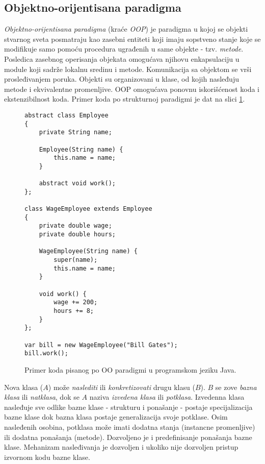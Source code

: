 \subsection{Objektno-orijentisana paradigma}
\label{subsec:ParadigmOOP}

\emph{Objektno-orijentisana paradigma} (kraće \emph{OOP}) je paradigma u kojoj se objekti stvarnog sveta posmatraju kao zasebni entiteti koji imaju sopstveno stanje koje se modifikuje samo pomoću procedura ugrađenih u same objekte - tzv. \emph{metode}. Posledica zasebnog operisanja objekata omogućava njihovu enkapsulaciju u module koji sadrže lokalnu sredinu i metode. Komunikacija sa objektom se vrši prosleđivanjem poruka. Objekti su organizovani u klase, od kojih nasleđuju metode i ekvivalentne promenljive. OOP omogućava ponovnu iskorišćenost koda i ekstenzibilnost koda. Primer koda po strukturnoj paradigmi je dat na slici \ref{fig:ParadigmOOP}. 

\begin{figure}[h!]
\begin{lstlisting}
abstract class Employee
{
    private String name;

    Employee(String name) {
        this.name = name;
    }

    abstract void work();
};

class WageEmployee extends Employee
{
    private double wage;
    private double hours;

    WageEmployee(String name) {
        super(name);
        this.name = name;
    }

    void work() {
        wage += 200;
        hours += 8;
    }
};

var bill = new WageEmployee("Bill Gates");
bill.work();
\end{lstlisting}
\caption{Primer koda pisanog po OO paradigmi u programskom jeziku Java.}
\label{fig:ParadigmOOP}
\end{figure}

Nova klasa ($A$) može \emph{naslediti} ili \emph{konkretizovati} drugu klasu ($B$). $B$ se zove \emph{bazna klasa} ili \emph{natklasa}, dok se $A$ naziva \emph{izvedena klasa} ili \emph{potklasa}. Izvedenna klasa nasleđuje sve odlike bazne klase - strukturu i ponašanje - postaje specijalizacija bazne klase dok bazna klasa postaje generalizacija svoje potklase. Osim nasleđenih osobina, potklasa može imati dodatna stanja (instancne promenljive) ili dodatna ponašanja (metode). Dozvoljeno je i predefinisanje ponašanja bazne klase. Mehanizam nasleđivanja je dozvoljen i ukoliko nije dozvoljen pristup izvornom kodu bazne klase.

